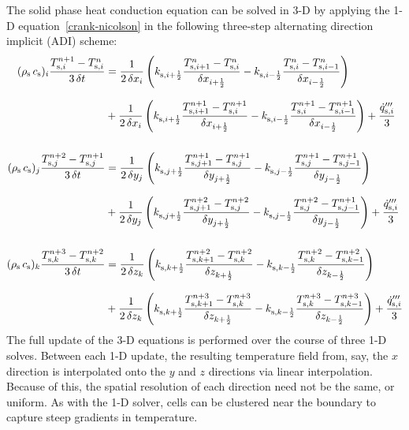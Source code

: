 The solid phase heat conduction equation can be solved in 3-D by applying the 1-D equation~\ref{crank-nicolson} in the following three-step alternating direction implicit (ADI) scheme:
\begin{align}
\label{crank-nicolson_3d}
(\rho_{\rm s} \, c_{\rm s})_i \frac{T_{{\rm s},i}^{n+1}-T_{{\rm s},i}^{n}}{3 \, \delta t}
& = \frac{1}{2 \, \delta x_i} \left( k_{{\rm s},i+\frac{1}{2}} \frac{T_{{\rm s},i+1}^{n}  -T_{{\rm s},i}^{n}}  {\delta x_{i+\frac{1}{2}}} - k_{{\rm s},i-\frac{1}{2}} \frac{T_{{\rm s},i}^{n}  -T_{{\rm s},i-1}^{n}}  {\delta x_{i-\frac{1}{2}}} \right) \notag \\[0.1in]
& + \frac{1}{2 \, \delta x_i} \left( k_{{\rm s},i+\frac{1}{2}} \frac{T_{{\rm s},i+1}^{n+1}-T_{{\rm s},i}^{n+1}}{\delta x_{i+\frac{1}{2}}} - k_{{\rm s},i-\frac{1}{2}} \frac{T_{{\rm s},i}^{n+1}-T_{{\rm s},i-1}^{n+1}}{\delta x_{i-\frac{1}{2}}} \right) + \frac{\dot{q}'''_{{\rm s},i}}{3}  \\[0.2in]
(\rho_{\rm s} \, c_{\rm s})_j \frac{T_{{\rm s},j}^{n+2}-T_{{\rm s},j}^{n+1}}{3 \, \delta t}
& = \frac{1}{2 \, \delta y_j} \left( k_{{\rm s},j+\frac{1}{2}} \frac{T_{{\rm s},j+1}^{n+1}-T_{{\rm s},j}^{n+1}}{\delta y_{j+\frac{1}{2}}} - k_{{\rm s},j-\frac{1}{2}} \frac{T_{{\rm s},j}^{n+1}-T_{{\rm s},j-1}^{n+1}}{\delta y_{j-\frac{1}{2}}} \right) \notag \\[0.1in]
& + \frac{1}{2 \, \delta y_j} \left( k_{{\rm s},j+\frac{1}{2}} \frac{T_{{\rm s},j+1}^{n+2}-T_{{\rm s},j}^{n+2}}{\delta y_{j+\frac{1}{2}}} - k_{{\rm s},j-\frac{1}{2}} \frac{T_{{\rm s},j}^{n+2}-T_{{\rm s},j-1}^{n+1}}{\delta y_{j-\frac{1}{2}}} \right) + \frac{\dot{q}'''_{{\rm s},i}}{3}  \\[0.2in]
(\rho_{\rm s} \, c_{\rm s})_k \frac{T_{{\rm s},k}^{n+3}-T_{{\rm s},k}^{n+2}}{3 \, \delta t}
& = \frac{1}{2 \, \delta z_k} \left( k_{{\rm s},k+\frac{1}{2}} \frac{T_{{\rm s},k+1}^{n+2}-T_{{\rm s},k}^{n+2}}{\delta z_{k+\frac{1}{2}}} - k_{{\rm s},k-\frac{1}{2}} \frac{T_{{\rm s},k}^{n+2}-T_{{\rm s},k-1}^{n+2}}{\delta z_{k-\frac{1}{2}}} \right) \notag \\[0.1in]
& + \frac{1}{2 \, \delta z_k} \left( k_{{\rm s},k+\frac{1}{2}} \frac{T_{{\rm s},k+1}^{n+3}-T_{{\rm s},k}^{n+3}}{\delta z_{k+\frac{1}{2}}} - k_{{\rm s},k-\frac{1}{2}} \frac{T_{{\rm s},k}^{n+3}-T_{{\rm s},k-1}^{n+3}}{\delta z_{k-\frac{1}{2}}} \right) + \frac{\dot{q}'''_{{\rm s},i}}{3}
\end{align}
The full update of the 3-D equations is performed over the course of three 1-D solves. Between each 1-D update, the resulting temperature field from, say, the $x$ direction is interpolated onto the $y$ and $z$ directions via linear interpolation. Because of this, the spatial resolution of each direction need not be the same, or uniform. As with the 1-D solver, cells can be clustered near the boundary to capture steep gradients in temperature.

